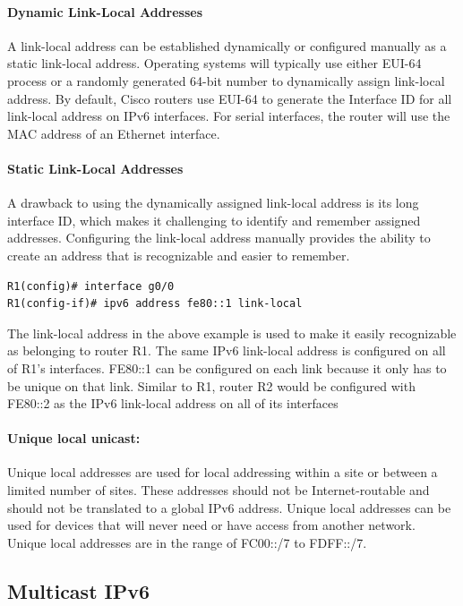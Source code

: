 \paragraph{Dynamic Link-Local Addresses} A link-local address can be established dynamically or configured manually as a static link-local address. Operating systems will typically use either EUI-64 process or a randomly generated 64-bit
number to dynamically assign link-local address. By default, Cisco routers use EUI-64 to generate the Interface ID for all link-local address on IPv6 interfaces. For serial interfaces, the router will use the MAC address of an Ethernet interface.

\paragraph{Static Link-Local Addresses} A drawback to using the dynamically assigned link-local address is its long interface ID, which makes it challenging to identify and remember assigned addresses. Configuring the link-local address manually provides the ability to create an address that is recognizable and easier to remember.

\begin{verbatim}
R1(config)# interface g0/0
R1(config-if)# ipv6 address fe80::1 link-local
\end{verbatim}

The link-local address in the above example is used to make it easily recognizable as belonging to router R1. The same IPv6 link-local address is configured on all of R1's interfaces. FE80::1 can be configured on each link because it only has to be unique on that link. Similar to R1, router R2 would be configured with FE80::2 as the IPv6 link-local address on all of its interfaces

\paragraph{Unique local unicast:}Unique local addresses are used for local addressing within a site or between a limited number of sites. These addresses should not be Internet-routable and should not be translated to a global IPv6 address. Unique local addresses can be used for devices that will never need or have access from another network. Unique local addresses are in the range of FC00::/7 to FDFF::/7.

\subsection{Multicast IPv6}

